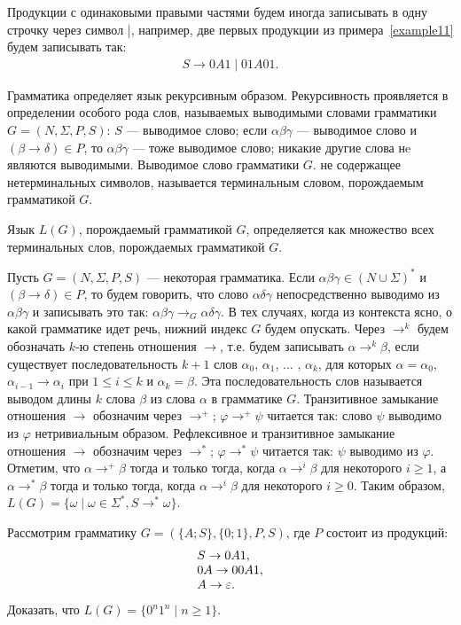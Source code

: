 Продукции с одинаковыми правыми частями будем иногда записывать в одну строчку через символ |, например, две первых продукции из примера~\ref{example11} будем записывать так:
\begin{equation}
\begin{array}{l}
	S \to 0A1 \mid 01A01.
\end{array}
\end{equation}

Грамматика определяет язык рекурсивным образом. Рекурсивность проявляется в определении особого рода слов, называемых выводимыми словами грамматики $G=(N,\Sigma,P,S)$: $S$ --- выводимое слово; если $\alpha\beta\gamma$ --- выводимое слово и $(\beta\to\delta)\in P$, то $\alpha\beta\gamma$ --- тоже выводимое слово; никакие другие слова нe являются выводимыми. Выводимое слово грамматики $G$. не содержащее нетерминальных символов, называется терминальным словом, порождаемым грамматикой $G$.

Язык $L(G)$, порождаемый грамматикой $G$, определяется как множество всех терминальных слов, порождаемых грамматикой $G$.

Пусть $G=(N,\Sigma,P,S)$ --- некоторая грамматика. Если $\alpha\beta\gamma\in(N\cup\Sigma)^*$ и $(\beta\to\delta)\in P$, то будем говорить, что слово $\alpha\delta\gamma$ непосредственно выводимо из $\alpha\beta\gamma$ и записывать это так: $\alpha\beta\gamma\to_G\alpha\delta\gamma$. В тех случаях, когда из контекста ясно, о какой грамматике идет речь, нижний индекс $G$ будем опускать. Через $\to^k$ будем обозначать $k$-ю степень отношения $\to$, т.е. будем записывать $\alpha\to^k\beta$, если существует последовательность $k+1$ слов $\alpha_0$, $\alpha_1$, $\ldots$ , $\alpha_k$, для которых $\alpha=\alpha_0$, $\alpha_{i-1}\to\alpha_i$ при $1\le i\le k$ и $\alpha_k=\beta$. Эта последовательность слов называется выводом длины $k$ слова $\beta$ из слова $\alpha$ в грамматике $G$. Транзитивное замыкание отношения $\to$ обозначим через $\to^+$; $\varphi\to^+\psi$  читается так: слово $\psi$ выводимо из $\varphi$ нетривиальным образом. Рефлексивное и транзитивное замыкание отношения $\to$ обозначим через $\to^*$; $\varphi\to^*\psi$ читается так: $\psi$ выводимо из $\varphi$. Отметим, что $\alpha\to^+\beta$ тогда и только тогда, когда $\alpha\to^i\beta$ для некоторого $i\ge 1$, а $\alpha\to^*\beta$ тогда и только тогда, когда $\alpha\to^i\beta$ для некоторого $i\ge 0$.
Таким образом, $L(G) = \{\omega\mid\omega\in\Sigma^*, S\to^*\omega\}$.

\begin{myproblem}
Рассмотрим грамматику $G=(\{A;S\},\{0;1\},P,S)$, где $P$ состоит из продукций:
\begin{equation}
\begin{array}{l}
    S  \to 0A1,\\
    0A \to 00A1,\\
    A  \to \varepsilon.
\end{array}
\end{equation}
Доказать, что $L(G)=\{0^n1^n\mid n\ge 1\}$.
\end{myproblem}


